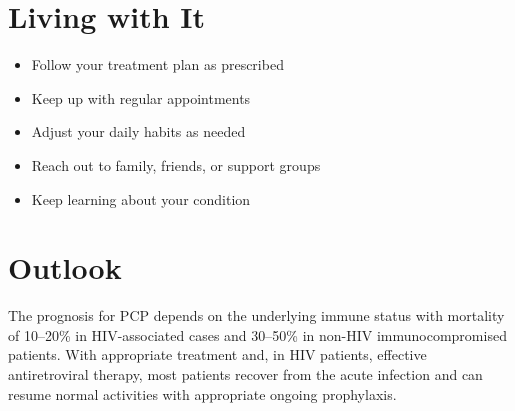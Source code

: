 \section{Living with It}

\begin{itemize}[noitemsep]
  \item Follow your treatment plan as prescribed
  \item Keep up with regular appointments
  \item Adjust your daily habits as needed
  \item Reach out to family, friends, or support groups
  \item Keep learning about your condition
\end{itemize}

\section{Outlook}
The prognosis for PCP depends on the underlying immune status with mortality of 10--20\% in HIV-associated cases and 30--50\% in non-HIV immunocompromised patients. With appropriate treatment and, in HIV patients, effective antiretroviral therapy, most patients recover from the acute infection and can resume normal activities with appropriate ongoing prophylaxis.
